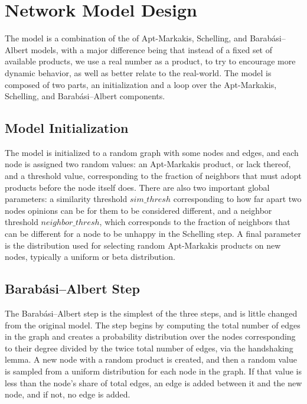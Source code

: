 \documentclass[12pt,twoside]{report}
\begin{document}
\section{Network Model Design}

The model is a combination of the of Apt-Markakis, Schelling, and Barabási–Albert models, with a major difference being that instead of a fixed set of available products, we use a real number as a product, to try to encourage more dynamic behavior, as well as better relate to the real-world. The model is composed of two parts, an initialization and a loop over the Apt-Markakis, Schelling, and Barabási–Albert components. \\

\subsection{Model Initialization}
The model is initialized to a random graph with some nodes and edges, and each node is assigned two random values: an Apt-Markakis product, or lack thereof, and a threshold value, corresponding to the fraction of neighbors that must adopt products before the node itself does. There are also two important global parameters: a similarity threshold $sim\_thresh$ corresponding to how far apart two nodes opinions can be for them to be considered different, and a neighbor threshold $neighbor\_thresh$, which corresponds to the fraction of neighbors that can be different for a node to be unhappy in the Schelling step. A final parameter is the distribution used for selecting random Apt-Markakis products on new nodes, typically a uniform or beta distribution. \\

\subsection{Barabási–Albert Step}

The Barabási–Albert step is the simplest of the three steps, and is little changed from the original model. The step begins by computing the total number of edges in the graph and creates a probability distribution over the nodes corresponding to their degree divided by the twice total number of edges, via the handshaking lemma. A new node with a random product is created, and then a random value is sampled from a uniform distribution for each node in the graph. If that value is less than the node's share of total edges, an edge is added between it and the new node, and if not, no edge is added. \\
\end{document}
